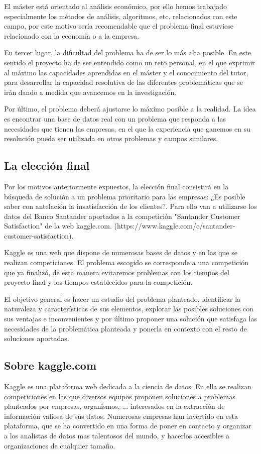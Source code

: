 \documentclass[11pt,a4paper,spanish]{article} %
\begin{document}
El máster está orientado al análisis económico, por ello hemos trabajado especialmente los métodos de análisis, algoritmos, etc. relacionados con este campo, por este motivo sería recomendable que el problema final estuviese relacionado con la economía o a la empresa. 

En tercer lugar, la dificultad del problema ha de ser lo más alta posible. En este sentido el proyecto ha de ser entendido como un reto personal, en el que exprimir al máximo las capacidades aprendidas en el máster y el conocimiento del tutor, para desarrollar la capacidad resolutiva de las diferentes problemáticas que se irán dando a medida que avancemos en la investigación.  

Por último, el problema deberá ajustarse lo máximo posible a la realidad. La idea es encontrar una base de datos real con un problema que responda a las necesidades que tienen las empresas, en el que la experiencia que ganemos en su resolución pueda ser utilizada en otros problemas y campos similares. 


\subsection{La elección final}
Por los motivos anteriormente expuestos, la elección final consistirá en la búsqueda de solución a un problema prioritario para las empresas: ¿Es posible saber con antelación la insatisfacción de los clientes?. Para ello van a utilizarse los datos del Banco Santander aportados a la competición "Santander Customer Satisfaction" de la web kaggle.com. (https://www.kaggle.com/c/santander-customer-satisfaction).

Kaggle es una web que dispone de numerosas bases de datos y en las que se realizan competiciones. El problema escogido se corresponde a una competición que ya finalizó, de esta manera evitaremos problemas con los tiempos del proyecto final y los tiempos establecidos para la competición. 
  
El objetivo general es hacer un estudio del problema planteado, identificar la naturaleza y características de sus elementos, explorar las posibles soluciones con sus ventajas e inconvenientes y por último proponer una solución que satisfaga las necesidades de la problemática planteada y ponerla en contexto con el resto de soluciones aportadas.

 

\subsection{Sobre kaggle.com}
Kaggle es una plataforma web dedicada a la ciencia de datos. En ella se realizan competiciones en las que diversos equipos proponen soluciones a problemas planteados por empresas, organismos, ... interesados en la extracción de información valiosa de sus datos. Numerosas empresas han invertido en esta plataforma, que se ha convertido en una forma de poner en contacto y organizar a los analistas de datos mas talentosos del mundo, y hacerlos accesibles a organizaciones de cualquier tamaño.
  
\end{document}
